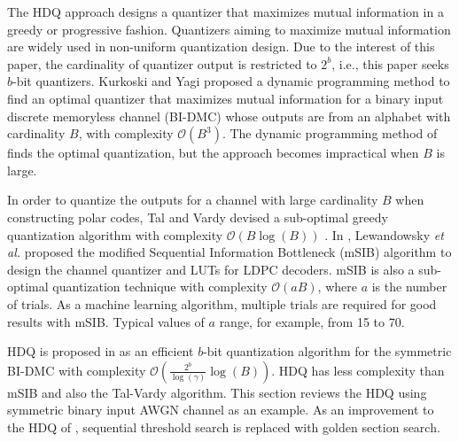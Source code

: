 \documentclass [PhD] {uclathes}
\begin{document}
The HDQ approach designs a quantizer that maximizes mutual information in a greedy or progressive fashion.  Quantizers aiming to maximize mutual information are widely used in non-uniform quantization design\cite{He2019-MIMQBP,Wang2020-RCQ,Lewandowsky2018-IBRegular,Stark2018-IBMA,Stark2020-IB5G,Meidlinger2015-MIMIB,Meidlinger2020-MINIBIRR,Meidlinger2017-MINIBIRR,Stark2020-IBjournal,Ghanaatian2018-MINIB-588, nathan-hdq, jiadong_softinfo_conf, jiadong_softinfo_jour}.
Due to the interest of this paper, the cardinality of quantizer output is restricted to $2^b$, i.e., this paper seeks $b$-bit quantizers.
Kurkoski and Yagi \cite{Tal2011-QuanVardy} proposed a dynamic programming method to find an {optimal} quantizer that maximizes mutual information for a binary input discrete memoryless channel (BI-DMC) whose outputs are from an alphabet with cardinality $B$,  with complexity $\mathcal{O}(B^3)$.
The dynamic programming method of \cite{Kurkoski2014-QuanDMC} finds the optimal quantization, but the approach becomes impractical when $B$ is large. 



In order to quantize the outputs for a channel with large cardinality $B$ when constructing polar codes,  Tal and Vardy devised a sub-optimal greedy quantization algorithm with complexity  $\mathcal{O}(B\log(B))$ \cite{Tal2011-QuanVardy}. In \cite{Lewandowsky2018-IBRegular}, Lewandowsky \textit{et al.} proposed the modified Sequential Information Bottleneck (mSIB) algorithm to design the channel quantizer and LUTs for LDPC decoders. mSIB is also a sub-optimal quantization technique with complexity $\mathcal{O}(aB)$, where $a$ is the number of trials. As a machine learning algorithm, multiple trials are required for good results with mSIB.  Typical values of $a$ range, for example, from 15 to 70.

HDQ is proposed in \cite{Wang2020-RCQ} as an efficient $b$-bit quantization algorithm for the symmetric BI-DMC with complexity $\mathcal{O}\left(\frac{2^b}{\log(\gamma)}\log(B)\right)$. HDQ has less complexity than mSIB and also the Tal-Vardy algorithm. This section reviews the HDQ using symmetric binary input AWGN channel as an example. As an improvement to the HDQ of \cite{Wang2020-RCQ}, sequential threshold search is replaced with golden section search\cite{Kiefer1953-pc}.
\end{document}
